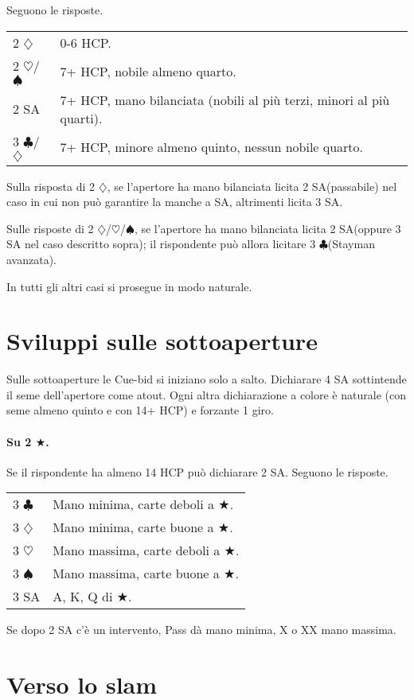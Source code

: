 \documentclass[a4paper,10pt]{article}
\renewcommand{\c}{$\clubsuit$\xspace}
\renewcommand{\d}{$\diamondsuit$\xspace}
\newcommand{\h}{$\heartsuit$\xspace}
\newcommand{\s}{$\spadesuit$\xspace}
\renewcommand{\j}{$\bigstar$\xspace}
\newcommand{\sa}{SA\xspace}
\newcommand{\smallspace}{\vskip0.3cm}
\newenvironment{twocol}
  {\smallspace\noindent\begin{tabular}{l p{0.78\textwidth}}}
  {\end{tabular}\smallspace}
\begin{document}
Seguono le risposte.
\begin{twocol}
  2 \d & 0-6 HCP.\\
  2 \h/\s & 7+ HCP, nobile almeno quarto.\\
  2 \sa & 7+ HCP, mano bilanciata (nobili al più terzi, minori al più quarti).\\
  3 \c/\d & 7+ HCP, minore almeno quinto, nessun nobile quarto.\\
\end{twocol}

Sulla risposta di 2 \d, se l'apertore ha mano bilanciata licita 2 \sa (passabile) nel caso in cui non può garantire la manche a \sa, altrimenti licita 3 \sa.

Sulle risposte di 2 \d/\h/\s, se l'apertore ha mano bilanciata licita 2 \sa (oppure 3 \sa nel caso descritto sopra); il rispondente può allora licitare 3 \c (Stayman avanzata).

In tutti gli altri casi si prosegue in modo naturale.


\pagebreak

\section{Sviluppi sulle sottoaperture}

Sulle sottoaperture le Cue-bid si iniziano solo a salto. Dichiarare 4 \sa sottintende il seme dell'apertore come atout. Ogni altra dichiarazione a colore è naturale (con seme almeno quinto e con 14+ HCP) e forzante 1 giro.

\paragraph{Su 2 \j.} Se il rispondente ha almeno 14 HCP può dichiarare 2 \sa. Seguono le risposte.
\begin{twocol}
 3 \c & Mano minima, carte deboli a \j.\\
 3 \d & Mano minima, carte buone a \j.\\
 3 \h & Mano massima, carte deboli a \j.\\
 3 \s & Mano massima, carte buone a \j.\\
 3 \sa & A, K, Q di \j.
\end{twocol}

\noindent Se dopo 2 \sa c'è un intervento, Pass dà mano minima, X o XX mano massima.




\pagebreak

\section{Verso lo slam}
\end{document}
